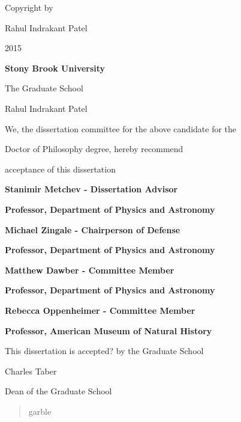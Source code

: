 \documentclass[phd,bottom,nosig]{usbthesis}
\author{Rahul Indrakant Patel}%
\title{}%
\begin{document}
\singlespacing %

\maketitle %


\newpage
{}

\vspace*{32\baselineskip}
\vspace*{1\baselineskip}
\centerline{Copyright by}
\centerline{Rahul Indrakant Patel}
\centerline{2015}


\newpage
{}
\setcounter{page}{2}

\centerline{\bf{Stony Brook University}}
\vspace*{1\baselineskip}
\centerline{The Graduate School}
\vspace*{2\baselineskip}
\centerline{Rahul Indrakant Patel}
\vspace*{2\baselineskip}
\centerline{We, the dissertation committee for the above candidate for the}
\vspace*{1\baselineskip}
\centerline{Doctor of Philosophy degree, hereby recommend}
\vspace*{1\baselineskip}
\centerline{acceptance of this dissertation}
\vspace*{2\baselineskip}
\centerline{\bf{Stanimir Metchev - Dissertation Advisor}}
\centerline{\bf{Professor, Department of Physics and Astronomy}}
\vspace*{1\baselineskip}
\centerline{\bf{Michael Zingale - Chairperson of Defense}}
\centerline{\bf{Professor, Department of Physics and Astronomy}}
\vspace*{1\baselineskip}
\centerline{\bf{Matthew Dawber - Committee Member}}
\centerline{\bf{Professor, Department of Physics and Astronomy}}
\vspace*{1\baselineskip}
\centerline{\bf{Rebecca Oppenheimer - Committee Member}}
\centerline{\bf{Professor, American Museum of Natural History}}
\vspace*{2\baselineskip}
\centerline{This dissertation is accepted? by the Graduate School}
\vspace*{3\baselineskip}
\centerline{Charles Taber}
\centerline{Dean of the Graduate School}

\newpage

\begin{abstract}
    garble%
\end{abstract}
\end{document}
